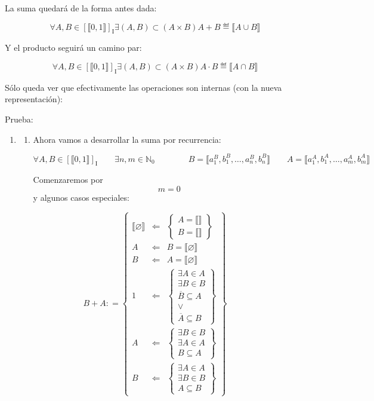 \documentclass[
]{article}
\begin{document}
\begin{enumerate}
  La suma quedará de la forma antes dada:

  \[\forall A,{B \in \left\lbrack {⟦0,1⟧} \right\rbrack_{\mathbf{\mathrm{I}}}}\exists{\left( {A,B} \right) \subset \left( {A \times B} \right)}{A + B} ≝ {⟦{A \cup B}⟧}\]

  Y el producto seguirá un camino par:

  \[\forall A,{B \in \left\lbrack {⟦0,1⟧} \right\rbrack_{\mathbf{\mathrm{I}}}}\exists{\left( {A,B} \right) \subset \left( {A \times B} \right)}{A \cdot B} ≝ {⟦{A \cap B}⟧}\]

  Sólo queda ver que efectivamente las operaciones son internas (con la
  nueva representación):

  Prueba:

  \begin{enumerate}
  \def\labelenumii{\arabic{enumii}.}
  \item
    \begin{enumerate}
    \def\labelenumiii{\arabic{enumiii}.}
    \item
      Ahora vamos a desarrollar la suma por recurrencia:

      \[\forall A,{B \in \left\lbrack {⟦0,1⟧} \right\rbrack_{\mathbf{\mathrm{I}}}}\qquad\exists n,{m \in {\mathbb{N}}_{0}}\mspace{72mu}{B = {⟦{a_{1}^{B},b_{1}^{B},\ldots,a_{n}^{B},b_{n}^{B}}⟧}}\qquad{A = {⟦{a_{1}^{A},b_{1}^{A},\ldots,a_{m}^{A},b_{m}^{A}}⟧}}\]

      Comenzaremos por \[m = 0\]y algunos casos especiales:
    \end{enumerate}
  \end{enumerate}

  \[{{B + A}{: =}}\begin{Bmatrix}
  {⟦\varnothing ⟧} & {\Leftarrow} & \begin{Bmatrix}
  {A = {⟦⟧}} \\
  {B = {⟦⟧}}
  \end{Bmatrix} \\
  A & {\Leftarrow} & {B = {⟦\varnothing ⟧}} \\
  B & {\Leftarrow} & {A = {⟦\varnothing ⟧}} \\
  1 & {\Leftarrow} & \begin{Bmatrix}
  {\exists{A \in A}} \\
  {\exists{B \in B}} \\
  {\overline{B} \subseteq A} \\
   \vee \\
  {\overline{A} \subseteq B}
  \end{Bmatrix} \\
  A & {\Leftarrow} & \begin{Bmatrix}
  {\exists{B \in B}} \\
  {\exists{A \in A}} \\
  {B \subseteq A}
  \end{Bmatrix} \\
  B & {\Leftarrow} & \begin{Bmatrix}
  {\exists{A \in A}} \\
  {\exists{B \in B}} \\
  {A \subseteq B}
  \end{Bmatrix}
  \end{Bmatrix}\]


\end{enumerate}
\end{document}
